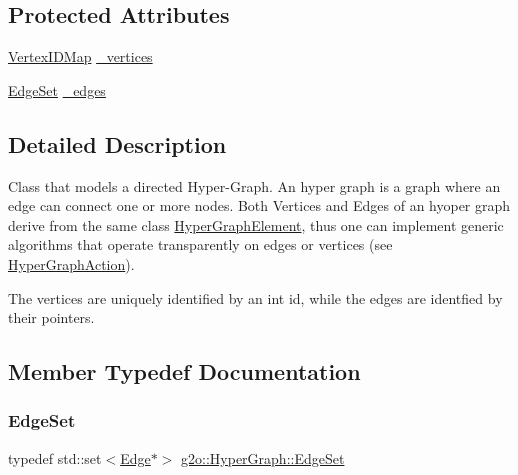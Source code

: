 \subsection*{Protected Attributes}
\begin{DoxyCompactItemize}
\item 
\mbox{\hyperlink{classg2o_1_1_hyper_graph_a97307eac064ebf4b3e2cfbf0718035b5}{Vertex\+I\+D\+Map}} \mbox{\hyperlink{classg2o_1_1_hyper_graph_a83132c77c8d0896581d168cbc72f673a}{\+\_\+vertices}}
\item 
\mbox{\hyperlink{classg2o_1_1_hyper_graph_a5e2970e236c0dcb4eff7c205d7b6b4ae}{Edge\+Set}} \mbox{\hyperlink{classg2o_1_1_hyper_graph_afe4ae6e9ef05c8bded2b1b30e1886b36}{\+\_\+edges}}
\end{DoxyCompactItemize}


\subsection{Detailed Description}
Class that models a directed Hyper-\/\+Graph. An hyper graph is a graph where an edge can connect one or more nodes. Both Vertices and Edges of an hyoper graph derive from the same class \mbox{\hyperlink{structg2o_1_1_hyper_graph_1_1_hyper_graph_element}{Hyper\+Graph\+Element}}, thus one can implement generic algorithms that operate transparently on edges or vertices (see \mbox{\hyperlink{classg2o_1_1_hyper_graph_action}{Hyper\+Graph\+Action}}).

The vertices are uniquely identified by an int id, while the edges are identfied by their pointers. 

\subsection{Member Typedef Documentation}
\mbox{\label{classg2o_1_1_hyper_graph_a5e2970e236c0dcb4eff7c205d7b6b4ae}} 
\subsubsection{\texorpdfstring{Edge\+Set}{EdgeSet}}
{\footnotesize\ttfamily typedef std\+::set$<$\mbox{\hyperlink{classg2o_1_1_hyper_graph_1_1_edge}{Edge}}$\ast$$>$ \mbox{\hyperlink{classg2o_1_1_hyper_graph_a5e2970e236c0dcb4eff7c205d7b6b4ae}{g2o\+::\+Hyper\+Graph\+::\+Edge\+Set}}}

